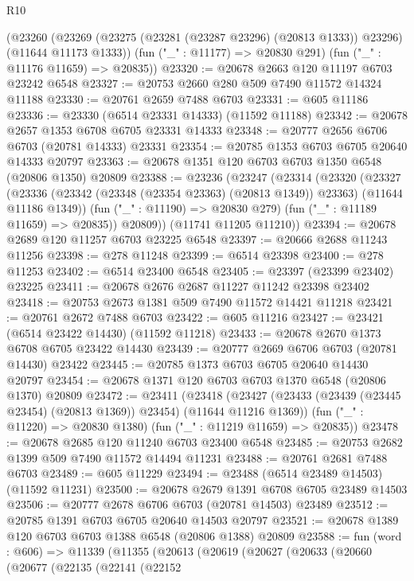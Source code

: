 \begin{lexlean}{R10}
\begin{coremodule}
    (@23260
      (@23269 (@23275 (@23281 (@23287 @23296) (@20813 @1333)) @23296) (@11644 @11173 @1333))
      (fun ("_" : @11177) => @20830 @291)
      (fun ("_" : @11176 @11659) => @20835))
@23320 := @20678 @2663 @120 @11197 @6703 @23242 @6548
@23327 := @20753 @2660 @280 @509 @7490 @11572 @14324 @11188
@23330 := @20761 @2659 @7488 @6703
@23331 := @605 @11186
@23336 := @23330 (@6514 @23331 @14333) (@11592 @11188)
@23342 := @20678 @2657 @1353 @6708 @6705 @23331 @14333
@23348 := @20777 @2656 @6706 @6703 (@20781 @14333) @23331
@23354 := @20785 @1353 @6703 @6705 @20640 @14333 @20797
@23363 := @20678 @1351 @120 @6703 @6703 @1350 @6548 (@20806 @1350) @20809
@23388 := @23236
    (@23247
      (@23314
        (@23320
          (@23327
            (@23336 (@23342 (@23348 (@23354 @23363) (@20813 @1349)) @23363) (@11644 @11186 @1349))
            (fun ("_" : @11190) => @20830 @279)
            (fun ("_" : @11189 @11659) => @20835))
          @20809))
      (@11741 @11205 @11210))
@23394 := @20678 @2689 @120 @11257 @6703 @23225 @6548
@23397 := @20666 @2688 @11243 @11256
@23398 := @278 @11248
@23399 := @6514 @23398
@23400 := @278 @11253
@23402 := @6514 @23400 @6548
@23405 := @23397 (@23399 @23402) @23225
@23411 := @20678 @2676 @2687 @11227 @11242 @23398 @23402
@23418 := @20753 @2673 @1381 @509 @7490 @11572 @14421 @11218
@23421 := @20761 @2672 @7488 @6703
@23422 := @605 @11216
@23427 := @23421 (@6514 @23422 @14430) (@11592 @11218)
@23433 := @20678 @2670 @1373 @6708 @6705 @23422 @14430
@23439 := @20777 @2669 @6706 @6703 (@20781 @14430) @23422
@23445 := @20785 @1373 @6703 @6705 @20640 @14430 @20797
@23454 := @20678 @1371 @120 @6703 @6703 @1370 @6548 (@20806 @1370) @20809
@23472 := @23411
    (@23418
      (@23427 (@23433 (@23439 (@23445 @23454) (@20813 @1369)) @23454) (@11644 @11216 @1369))
      (fun ("_" : @11220) => @20830 @1380)
      (fun ("_" : @11219 @11659) => @20835))
@23478 := @20678 @2685 @120 @11240 @6703 @23400 @6548
@23485 := @20753 @2682 @1399 @509 @7490 @11572 @14494 @11231
@23488 := @20761 @2681 @7488 @6703
@23489 := @605 @11229
@23494 := @23488 (@6514 @23489 @14503) (@11592 @11231)
@23500 := @20678 @2679 @1391 @6708 @6705 @23489 @14503
@23506 := @20777 @2678 @6706 @6703 (@20781 @14503) @23489
@23512 := @20785 @1391 @6703 @6705 @20640 @14503 @20797
@23521 := @20678 @1389 @120 @6703 @6703 @1388 @6548 (@20806 @1388) @20809
@23588 := fun (word : @606) =>
  @11339
    (@11355
      (@20613
        (@20619
          (@20627
            (@20633
              (@20660
                (@20677
                  (@22135
                    (@22141
                      (@22152

\end{coremodule}
\end{lexlean}
